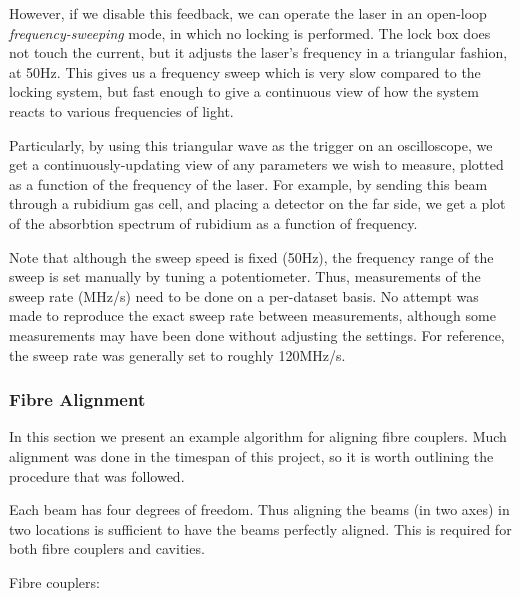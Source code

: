 However, if we disable this feedback, we can operate the laser in an open-loop \emph{frequency-sweeping} mode, in which no locking is performed.  The lock box does not touch the current, but it adjusts the laser's frequency in a triangular fashion, at 50Hz.  This gives us a frequency sweep which is very slow compared to the locking system, but fast enough to give a continuous view of how the system reacts to various frequencies of light.

Particularly, by using this triangular wave as the trigger on an oscilloscope, we get a continuously-updating view of any parameters we wish to measure, plotted as a function of the frequency of the laser.  For example, by sending this beam through a rubidium gas cell, and placing a detector on the far side, we get a plot of the absorbtion spectrum of rubidium as a function of frequency.

Note that although the sweep speed is fixed (50Hz), the frequency range of the sweep is set manually by tuning a potentiometer.  Thus, measurements of the sweep rate (MHz/s) need to be done on a per-dataset basis.  No attempt was made to reproduce the exact sweep rate between measurements, although some measurements may have been done without adjusting the settings.  For reference, the sweep rate was generally set to roughly 120MHz/s.
    
    \subsubsection{Fibre Alignment}

In this section we present an example algorithm for aligning fibre couplers.  Much alignment was done in the timespan of this project, so it is worth outlining the procedure that was followed.

Each beam has four degrees of freedom.  Thus aligning the beams (in two axes) in two locations is sufficient to have the beams perfectly aligned.  This is required for both fibre couplers and cavities.

Fibre couplers:

